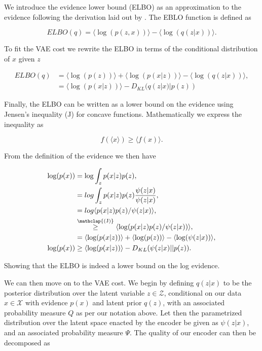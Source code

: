 We introduce the evidence lower bound (ELBO) as an approximation to the evidence following the derivation laid out by \cite{Kingma2013}. The EBLO function is defined as 

\begin{equation}\label{eq:elbo}
ELBO(q) = \langle \log(p(z, x)) \rangle - \langle \log(q(z|x)) \rangle.
\end{equation}

\noindent To fit the VAE cost we rewrite the ELBO in terms of the conditional distribution of $x$ given $z$

\begin{align}
ELBO(q) &= \langle \log(p(z)) \rangle +  \langle \log(p(x|z)) \rangle - \langle \log(q(z|x)) \rangle, \\
&=   \langle \log(p(x|z)) \rangle - D_{KL}(q(z|x) | p(z))
\end{align}

\noindent Finally, the ELBO can be written as a lower bound on the evidence using Jensen's inequality (J) for concave functions. Mathematically we express the inequality as 

\begin{equation}
f(\langle x\rangle) \geq \langle f(x) \rangle.
\end{equation}

\noindent From the definition of the evidence we then have

\begin{align}
\log (p(x)) &= \log \int_z p(x|z) p(z), \\
&= log \int _z p(x|z) p(z) \frac{\psi(z|x)}{\psi(z|x)},\\
& = log \langle p(x|z) p(z)/ \psi (z|x) \rangle, \\
&  \stackrel{\mathclap{\text{(J)}}}{\geq} \langle \log (p(x|z) p(z)/ \psi(z|x))\rangle,\\
& = \langle \log(p(x|z))\rangle + \langle \log(p(z))\rangle  - \langle \log(\psi (z|x))\rangle, \\
\log (p (x)) &\geq \langle \log(p(x|z))\rangle - D_{KL}(\psi (z|x) || p(z)).
\end{align}

\noindent Showing that the ELBO is indeed a lower bound on the log evidence. 

 We can then move on to the VAE cost. We begin by defining $q(z|x)$ to be the posterior distribution over the latent variable $z \in \mathcal{Z}$, conditional on our data $x \in \mathcal{X}$ with evidence $p(x)$ and latent prior $q(z)$, with an associated probability measure $Q$ as per our notation above. Let then the parametrized distribution over the latent space enacted by the encoder be given as $\psi(z|x)$, and an associated probability measure $\Psi$. The quality of our encoder can then be decomposed as 

